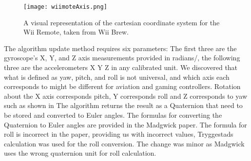 \begin{figure}[h!]
  \centering
    \texttt{[image: wiimoteAxis.png]}
    \caption{\footnotesize A visual representation of the cartesian coordinate system for the Wii Remote, taken from Wii Brew\cite{wiiBrew}.}
\end{figure}


The algorithm update method requires six parameters: The first three are the gyroscope's X, Y, and Z axis measurements provided in radians/, the following three are the accelerometers X Y Z in any calibrated unit. We discovered that what is defined as yaw, pitch, and roll is not universal, and which axis each corresponds to might be different for aviation and gaming controllers. Rotation about the X axis corresponds pitch, Y corresponds roll and Z corresponds to yaw such as shown in %
The algorithm returns the result as a Quaternion that need to be stored and converted to Euler angles. The formulas for converting the Quaternion to Euler angles are provided in the Madgwick paper. The formula for roll is incorrect in the paper, providing us with incorrect values, Tryggestads calculation was used for the roll conversion. The change was minor as Madgwick uses the wrong quaternion unit for roll calculation.

